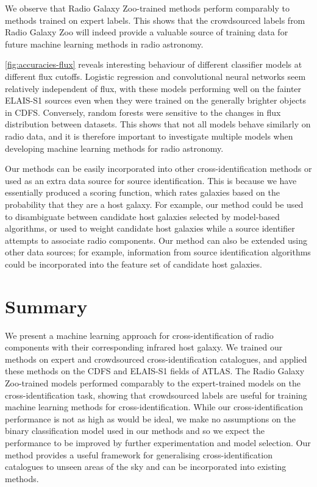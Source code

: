 \documentclass[fleqn,usenatbib,usedcolumn]{mnras}
\begin{document}
  We observe that Radio Galaxy Zoo-trained methods perform comparably to
  methods trained on expert labels. This shows that the crowdsourced labels
  from Radio Galaxy Zoo will indeed provide a valuable source of training
  data for future machine learning methods in radio astronomy.

  \autoref{fig:accuracies-flux} reveals interesting behaviour of different
  classifier models at different flux cutoffs. Logistic regression and
  convolutional neural networks seem relatively independent of flux, with
  these models performing well on the fainter ELAIS-S1 sources even when
  they were trained on the generally brighter objects in CDFS. Conversely,
  random forests were sensitive to the changes in flux distribution between
  datasets. This shows that not all models behave similarly on radio data,
  and it is therefore important to investigate multiple models when
  developing machine learning methods for radio astronomy.

  Our methods can be easily incorporated into other cross-identification
  methods or used as an extra data source for source identification. This is
  because we have essentially produced a scoring function, which rates
  galaxies based on the probability that they are a host galaxy. For
  example, our method could be used to disambiguate between candidate host
  galaxies selected by model-based algorithms, or used to weight candidate
  host galaxies while a source identifier attempts to associate radio
  components. Our method can also be extended using other data sources; for
  example, information from source identification algorithms could be
  incorporated into the feature set of candidate host galaxies.

\section{Summary}

  We present a machine learning approach for cross-identification of radio
  components with their corresponding infrared host galaxy. We trained our
  methods on expert and crowdsourced cross-identification catalogues, and
  applied these methods on the CDFS and ELAIS-S1 fields of ATLAS. The Radio
  Galaxy Zoo-trained models performed comparably to the expert-trained models
  on the cross-identification task, showing that crowdsourced labels are
  useful for training machine learning methods for cross-identification. While
  our cross-identification performance is not as high as would be ideal, we
  make no assumptions on the binary classification model used in our methods
  and so we expect the performance to be improved by further experimentation
  and model selection. Our method provides a useful framework for generalising
  cross-identification catalogues to unseen areas of the sky and can be
  incorporated into existing methods.
\end{document}
